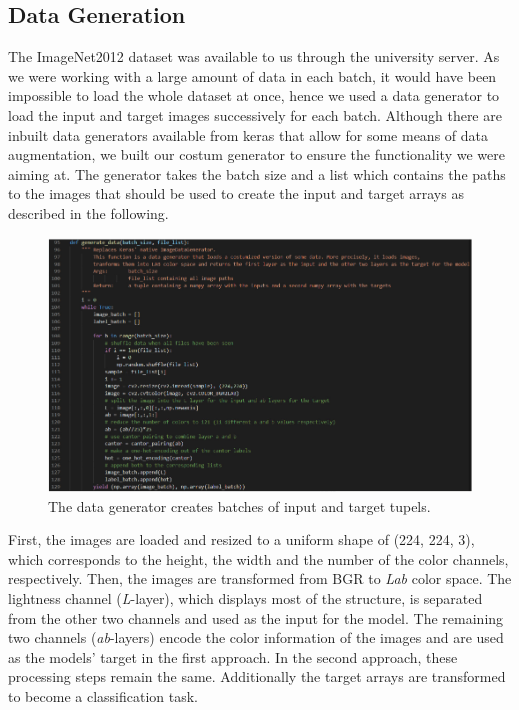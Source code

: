 \documentclass[12pt,letterpaper]{article}
\begin{document}
\subsection{Data Generation}
The ImageNet2012 dataset was available to us through the university server. As we were working with a large amount of data in each batch, it would have been impossible to load the whole dataset at once, hence we used a data generator to load the input and target images successively for each batch. Although there are inbuilt data generators available from keras that allow for some means of data augmentation, we built our costum generator to ensure the functionality we were aiming at. The generator takes the batch size and a list which contains the paths to the images that should be used to create the input and target arrays as described in the following.\\
\begin{figure}[htb]
	\centering
	\includegraphics[width=1.0\textwidth]{code_datagen.png}
	\caption{The data generator creates batches of input and target tupels.}
	\label{datagen}
\end{figure}First, the images are loaded and resized to a uniform shape of (224, 224, 3), which corresponds to the height, the width and the number of the color channels, respectively. Then, the images are transformed from BGR to \emph{Lab} color space. The lightness channel (\emph{L}-layer), which displays most of the structure, is separated from the other two channels and used as the input for the model. The remaining two channels (\emph{ab}-layers) encode the color information of the images and are used as the models’ target in the first approach. In the second approach, these processing steps remain the same. Additionally the target arrays are transformed to become a classification task.\\\\
\end{document}
